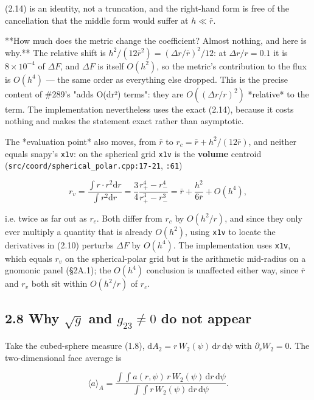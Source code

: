 \documentclass[11pt,a4paper]{article}
\begin{document}
(2.14) is an identity, not a truncation, and the right-hand form is free of the
cancellation that the middle form would suffer at $h\ll\bar r$.

**How much does the metric change the coefficient? Almost nothing, and here is
why.** The relative shift is $h^2/(12\bar r^2) = (\Delta r/\bar r)^2/12$: at
$\Delta r/r=0.1$ it is $8\times10^{-4}$ of $\Delta F$, and $\Delta F$ is itself
$O(h^2)$, so the metric's contribution to the flux is $O(h^4)$ — the same order
as everything else dropped. This is the precise content of \#289's
"adds O(dr²) terms": they are $O((\Delta r/r)^2)$ *relative* to the term. The
implementation nevertheless uses the exact (2.14), because it costs nothing and
makes the statement exact rather than asymptotic.

The *evaluation point* also moves, from $\bar r$ to $r_c=\bar r+h^2/(12\bar r)$,
and neither equals snapy's \texttt{x1v}: on the spherical grid \texttt{x1v} is the \textbf{volume}
centroid (\texttt{src/coord/spherical\_polar.cpp:17-21}, \texttt{:61})

\begin{equation*}
r_v = \frac{\int r\cdot r^2\mathrm{d}r}{\int r^2\mathrm{d}r}
= \frac34\frac{r_+^4-r_-^4}{r_+^3-r_-^3} = \bar r+\frac{h^2}{6\bar r}+O(h^4),
\tag{2.15}
\end{equation*}

i.e. twice as far out as $r_c$. Both differ from $r_c$ by $O(h^2/r)$, and since
they only ever multiply a quantity that is already $O(h^2)$, using \texttt{x1v} to
locate the derivatives in (2.10) perturbs $\Delta F$ by $O(h^4)$. The
implementation uses \texttt{x1v}, which equals $r_v$ on the spherical-polar grid but is
the arithmetic mid-radius on a gnomonic panel (§2A.1); the $O(h^4)$ conclusion is
unaffected either way, since $\bar r$ and $r_v$ both sit within $O(h^2/r)$ of
$r_c$.

\subsection*{2.8 Why $\sqrt{g}$ and $g_{23}\neq0$ do not appear}

Take the cubed-sphere measure (1.8), $\mathrm{d}A_2=r\,W_2(\psi)\,\mathrm{d}r\,\mathrm{d}\psi$
with $\partial_r W_2=0$. The two-dimensional face average is

\begin{equation*}
\langle a\rangle_A
= \frac{\displaystyle\int\!\!\int a(r,\psi)\,r\,W_2(\psi)\,\mathrm{d}r\,\mathrm{d}\psi}
       {\displaystyle\int\!\!\int r\,W_2(\psi)\,\mathrm{d}r\,\mathrm{d}\psi}.
\tag{2.16}
\end{equation*}
\end{document}

